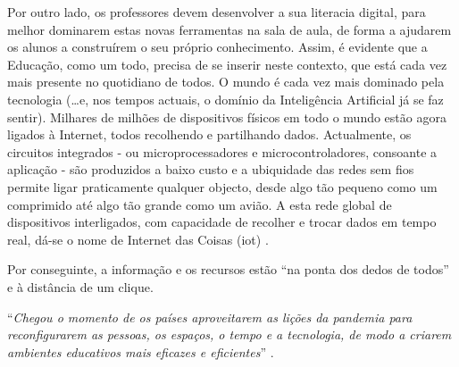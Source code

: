 Por outro lado, os professores devem desenvolver a sua literacia digital, para melhor dominarem estas novas ferramentas na sala de aula, de forma a ajudarem os alunos a construírem o seu próprio conhecimento. Assim, é evidente que a Educação, como um todo, precisa de se inserir neste contexto, que está cada vez mais presente no quotidiano de todos. O mundo é cada vez mais dominado pela tecnologia (\ldots e, nos tempos actuais, o domínio da Inteligência Artificial já se faz sentir). Milhares de milhões de dispositivos físicos em todo o mundo estão agora ligados à Internet, todos recolhendo e partilhando dados. Actualmente, os circuitos integrados - ou microprocessadores e microcontroladores, consoante a aplicação - são produzidos a baixo custo e a ubiquidade das redes sem fios permite ligar praticamente qualquer objecto, desde algo tão pequeno como um comprimido até algo tão grande como um avião. A esta rede global de dispositivos interligados, com capacidade de recolher e trocar dados em tempo real, dá-se o nome de Internet das Coisas (\acrshort{iot}) \cite{IoT}.

Por conseguinte, a informação e os recursos estão “na ponta dos dedos de todos” e à distância de um clique.

\begin{center}
    ``\textit{Chegou o momento de os países aproveitarem as lições da pandemia para reconfigurarem as pessoas, os espaços, o tempo e a tecnologia, de modo a criarem ambientes educativos mais eficazes e eficientes}'' \cite{thestateofeducation}.
\end{center}

